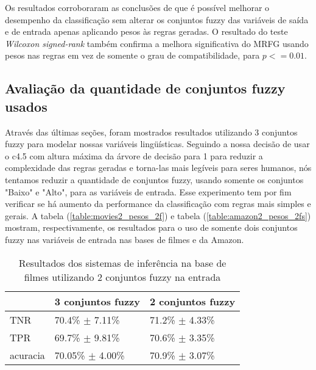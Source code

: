 %
%
%

Os resultados corroboraram as conclusões de \cite{ishibuchi2001effect} que é possível melhorar o desempenho da classificação sem alterar os conjuntos fuzzy das variáveis de saída e de entrada apenas aplicando pesos às regras geradas. O resultado do teste \textit{Wilcoxon signed-rank} também confirma a melhora significativa do MRFG usando pesos nas regras em vez de somente o grau de compatibilidade, para $p <= 0.01$.

\subsection{Avaliação da quantidade de conjuntos fuzzy usados}

Através das últimas seções, foram mostrados resultados utilizando 3 conjuntos fuzzy para modelar nossas variáveis lingüísticas. Seguindo a nossa decisão de usar o c4.5 com altura máxima da árvore de decisão para 1 para reduzir a complexidade das regras geradas e torna-las mais legíveis para seres humanos, nós tentamos reduzir a quantidade de conjuntos fuzzy, usando somente os conjuntos "Baixo" e "Alto", para as variáveis de entrada. Esse experimento tem por fim verificar se há aumento da performance da classificação com regras mais simples e gerais. A tabela (\ref{table:movies2_pesos_2f}) e tabela (\ref{table:amazon2_pesos_2fs}) mostram, respectivamente, os resultados para o uso de somente dois conjuntos fuzzy nas variáveis de entrada nas bases de filmes e da Amazon.

\begin{table}[!h]
    \begin{tabular}{lll}
    ~         			& 3 conjuntos fuzzy 							& 2 conjuntos fuzzy \\ \hline
    TNR 		  		& 70.4\% $\pm$ 7.11\%         			& 71.2\% $\pm$ 4.33\%    \\
    TPR    		 	& 69.7\% $\pm$ 9.81\%        			& 70.6\% $\pm$ 3.35\%   \\
    acuracia  	 	& 70.05\% $\pm$ 4.00\%    			& 70.9\% $\pm$ 3.07\%    \\
    \end{tabular}
    \caption{Resultados dos sistemas de inferência na base de filmes utilizando 2 conjuntos fuzzy na entrada}
	\label{table:movies2_pesos_2fs}
\end{table}

